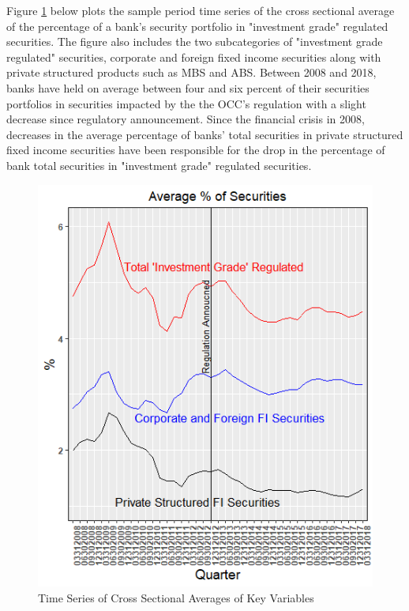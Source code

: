 \documentclass[preprint,12pt]{elsarticle}
\begin{document}
Figure \ref{Figure 1} below plots the sample period time series of the cross sectional average of the percentage of a bank's security portfolio in "investment grade" regulated securities.  The figure also includes the two subcategories of "investment grade regulated" securities, corporate and foreign fixed income securities along with private structured products such as MBS and ABS.  Between 2008 and 2018, banks have held on average between four and six percent of their securities portfolios in securities impacted by the the OCC's regulation with a slight decrease since regulatory announcement.  Since the financial crisis in 2008, decreases in the average percentage of banks' total securities in private structured fixed income securities have been responsible for the drop in the percentage of bank total securities in "investment grade" regulated securities.

\begin{figure}[h!]
\centering
\caption{Time Series of Cross Sectional Averages of Key Variables}
\label{Figure 1}
\includegraphics[width = .59999\linewidth]{Rplot}
\end{figure}
\end{document}
